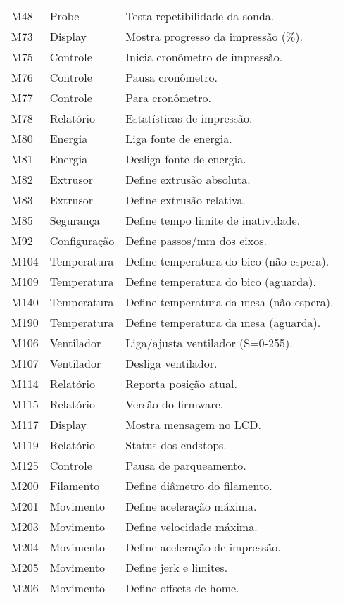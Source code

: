 \begin{longtable}{|l|l|p{\funcwidth}|}
			M48 & Probe & Testa repetibilidade da sonda. \\
			M73 & Display & Mostra progresso da impressão (\%). \\
			M75 & Controle & Inicia cronômetro de impressão. \\
			M76 & Controle & Pausa cronômetro. \\
			M77 & Controle & Para cronômetro. \\
			M78 & Relatório & Estatísticas de impressão. \\
			M80 & Energia & Liga fonte de energia. \\
			M81 & Energia & Desliga fonte de energia. \\
			M82 & Extrusor & Define extrusão absoluta. \\
			M83 & Extrusor & Define extrusão relativa. \\
			M85 & Segurança & Define tempo limite de inatividade. \\
			M92 & Configuração & Define passos/mm dos eixos. \\
			M104 & Temperatura & Define temperatura do bico (não espera). \\
			M109 & Temperatura & Define temperatura do bico (aguarda). \\
			M140 & Temperatura & Define temperatura da mesa (não espera). \\
			M190 & Temperatura & Define temperatura da mesa (aguarda). \\
			M106 & Ventilador & Liga/ajusta ventilador (S=0-255). \\
			M107 & Ventilador & Desliga ventilador. \\
			M114 & Relatório & Reporta posição atual. \\
			M115 & Relatório & Versão do firmware. \\
			M117 & Display & Mostra mensagem no LCD. \\
			M119 & Relatório & Status dos endstops. \\
			M125 & Controle & Pausa de parqueamento. \\
			M200 & Filamento & Define diâmetro do filamento. \\
			M201 & Movimento & Define aceleração máxima. \\
			M203 & Movimento & Define velocidade máxima. \\
			M204 & Movimento & Define aceleração de impressão. \\
			M205 & Movimento & Define jerk e limites. \\
			M206 & Movimento & Define offsets de home. \\

\end{longtable}

